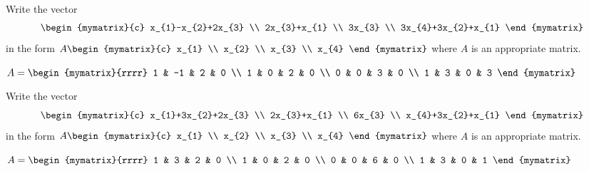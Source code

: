 \begin{ex} Write the vector
  \begin{equation*}
    \begin{mymatrix}{c}
      x_{1}-x_{2}+2x_{3} \\
      2x_{3}+x_{1} \\
      3x_{3} \\
      3x_{4}+3x_{2}+x_{1}
    \end{mymatrix}
  \end{equation*}
  in the form $A\begin{mymatrix}{c}
    x_{1} \\
    x_{2} \\
    x_{3} \\
    x_{4}
  \end{mymatrix} $ where $A$ is an appropriate matrix.
  \begin{sol}
    $A=\begin{mymatrix}{rrrr}
      1 & -1 & 2 & 0 \\
      1 & 0 & 2 & 0 \\
      0 & 0 & 3 & 0 \\
      1 & 3 & 0 & 3
    \end{mymatrix} $
  \end{sol}
\end{ex}

\begin{ex} Write the vector
  \begin{equation*}
    \begin{mymatrix}{c}
      x_{1}+3x_{2}+2x_{3} \\
      2x_{3}+x_{1} \\
      6x_{3} \\
      x_{4}+3x_{2}+x_{1}
    \end{mymatrix}
  \end{equation*}
  in the form $A\begin{mymatrix}{c}
    x_{1} \\
    x_{2} \\
    x_{3} \\
    x_{4}
  \end{mymatrix} $ where $A$ is an appropriate matrix.
  \begin{sol}
    $A=\begin{mymatrix}{rrrr}
      1 & 3 & 2 & 0 \\
      1 & 0 & 2 & 0 \\
      0 & 0 & 6 & 0 \\
      1 & 3 & 0 & 1
    \end{mymatrix}$
  \end{sol}
\end{ex}

